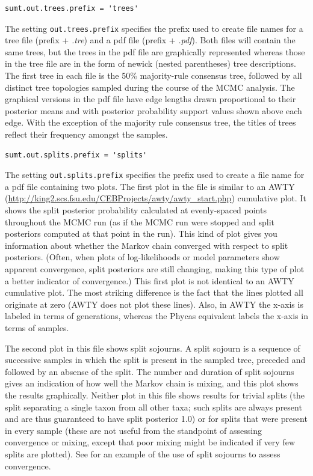 \documentclass[10pt]{article}
\newcommand{\pathname}[1]{{\em #1}}			%
\newcommand{\opt}[1]{{\tt \small #1}\index{#1}}		%
\begin{document}
\begin{samepage}
\begin{verbatim}
sumt.out.trees.prefix = 'trees'
\end{verbatim}
The setting \opt{out.trees.prefix} specifies the prefix used to create file names for a tree file (prefix + \pathname{.tre}) and a pdf file (prefix + \pathname{.pdf}). Both files will contain the same trees, but the trees in the pdf file are graphically represented whereas those in the tree file are in the form of newick (nested parentheses) tree descriptions. The first tree in each file is the 50\% majority-rule consensus tree, followed by all distinct tree topologies sampled during the course of the MCMC analysis. The graphical versions in the pdf file have edge lengths drawn proportional to their posterior means and with posterior probability support values shown above each edge. With the exception of the majority rule consensus tree, the titles of trees reflect their frequency amongst the samples. 
\end{samepage}

\begin{samepage}
\begin{verbatim}
sumt.out.splits.prefix = 'splits'
\end{verbatim}
The setting \opt{out.splits.prefix} specifies the prefix used to create a file name for a pdf file containing two plots. The first plot in the file is similar to an AWTY (\url{http://king2.scs.fsu.edu/CEBProjects/awty/awty_start.php}) cumulative plot. It shows the split posterior probability calculated at evenly-spaced points throughout the MCMC run (as if the MCMC run were stopped and split posteriors computed at that point in the run). This kind of plot gives you information about whether the Markov chain converged with respect to split posteriors. (Often, when plots of log-likelihoods or model parameters show apparent convergence, split posteriors are still changing, making this type of plot a better indicator of convergence.) This first plot is not identical to an AWTY cumulative plot. The most striking difference is the fact that the lines plotted all originate at zero (AWTY does not plot these lines). Also, in AWTY the x-axis is labeled in terms of generations, whereas the Phycas equivalent labels the x-axis in terms of samples. 

The second plot in this file shows split sojourns. A split sojourn is a sequence of successive samples in which the split is present in the sampled tree, preceded and followed by an absense of the split. The number and duration of split sojourns gives an indication of how well the Markov chain is mixing, and this plot shows the results graphically. Neither plot in this file shows results for trivial splits (the split separating a single taxon from all other taxa; such splits are always present and are thus guaranteed to have split posterior 1.0) or for splits that were present in every sample (these are not useful from the standpoint of assessing convergence or mixing, except that poor mixing might be indicated if very few splits are plotted). See \citet{LewisLewis2005} for an example of the use of split sojourns to assess convergence. 
\end{samepage}
\end{document}
